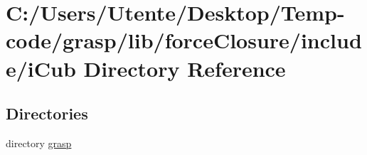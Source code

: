 \section{C\+:/\+Users/\+Utente/\+Desktop/\+Temp-\/code/grasp/lib/force\+Closure/include/i\+Cub Directory Reference}
\label{dir_9c39d2143efe67bb56bc75adfc7ac268}
\subsection*{Directories}
\begin{DoxyCompactItemize}
\item 
directory \hyperlink{dir_9443321fa53dd729c55cd1c9b7a93c69}{grasp}
\end{DoxyCompactItemize}
